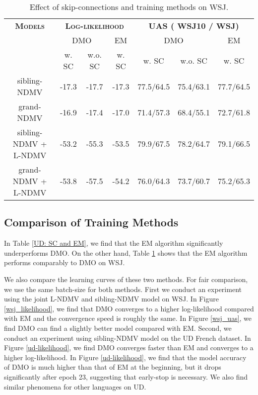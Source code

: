 \documentclass[11pt]{article}
\begin{document}
\begin{table}[t]
\centering
\small
\begin{tabular}{c|cc|c|cc|c}
\hline
  \bf\textsc{Models}                               & \multicolumn{3}{c|}{\bf\textsc{Log-likelihood}}          & \multicolumn{3}{c}{\bf\textsc{UAS ( WSJ10 / WSJ)}}           \\ \cline{2-7} 
                                      & \multicolumn{2}{c|}{DMO}             & EM    & \multicolumn{2}{c|}{DMO}               & EM        \\ \cline{2-7} 
                                      & \multicolumn{1}{c|}{w. SC} & w.o. SC & w. SC & \multicolumn{1}{c|}{w. SC} & w.o. SC   & w. SC     \\ \hline
sibling-NDMV                          & -17.3                      & -17.7   & -17.3 & 77.5/64.5                  & 75.4/63.1 & 77.7/64.5 \\
grand-NDMV                            & -16.9                      & -17.4   & -17.0 & 71.4/57.3                  & 68.4/55.1 & 72.7/61.8 \\
sibling-NDMV + L-NDMV & -53.2                      & -55.3   & -53.5 & 79.9/67.5                  & 78.2/64.7 & 79.1/66.5 \\
grand-NDMV + L-NDMV  & -53.8                      & -57.5   & -54.2 & 76.0/64.3                  & 73.7/60.7 & 75.2/65.3 \\ \hline
\end{tabular}
\caption{Effect of skip-connections and training methods on WSJ.}
\label{WSJ: SC and EM}
\end{table}



\subsection{Comparison of Training Methods}
In Table \ref{UD: SC and EM}, we find that the EM algorithm significantly underperforms DMO. On the other hand, Table \ref{WSJ: SC and EM} shows that the EM algorithm performs comparably to DMO on WSJ.
 
We also compare the learning curves of these two methods. For fair comparison, we use the same batch-size for both methods. First we conduct an experiment using the joint L-NDMV and sibling-NDMV model on WSJ. In Figure \ref{wsj_likelihood}, we find that DMO converges to a higher log-likelihood compared with EM and the convergence speed is roughly the same.  In Figure \ref{wsj_uas}, we find DMO can find a slightly better model compared with EM. Second, we conduct an experiment using sibling-NDMV model on the UD French dataset. In Figure \ref{ud-likelihood}, we find DMO converges faster than EM and converges to a higher log-likelihood. In Figure \ref{ud-likelihood}, we find that the model accuracy of DMO is much higher than that of EM at the beginning, but it drops significantly after epoch 23, suggesting that early-stop is necessary. We also find similar phenomena for other languages on UD. 
\end{document}
